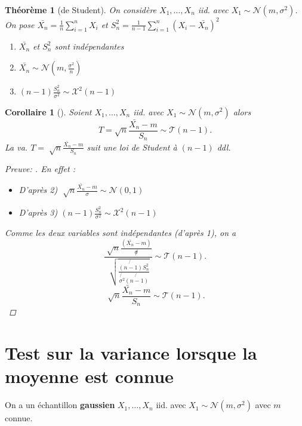\documentclass{article}
\theoremstyle{plain}%
\newtheorem{thm}{Théorème}[section]
\newtheorem*{cor}{Corollaire}
\theoremstyle{definition}
\theoremstyle{remark}
\begin{document}
\begin{thm}[de Student]
    On considère $ X_1, \dots, X_n $ iid. avec $ X_1 \sim \mathcal{N}(m, \sigma ^2) $. \\
    On pose $ \bar{X_n} = \frac{1}{n}\sum_{i=1}^{n}X_i $ et $ S_n^2 = \frac{1}{n-1}\sum_{i=1}^{n}(X_i - \bar{X_n})^2$ 
    \begin{enumerate}
        \item $ \bar{X_n} $ et $ S_n^2 $ sont indépendantes
        \item $ \bar{X_n} \sim \mathcal{N}(m, \frac{\sigma ^2}{n}) $ 
        \item $ (n-1) \frac{S_n^2}{\sigma ^2} \sim \mathcal{X}^2 (n-1) $ 
    \end{enumerate}
\end{thm}

\begin{cor}[]
    Soient $ X_1, \dots, X_n $ iid. avec $ X_1 \sim \mathcal{N}(m, \sigma ^2) $ alors 
    \[
        T = \sqrt{n} \frac{\bar{X_n} - m }{S_n} \sim \mathcal{T}(n-1)
    .\]
    La va. $ T= \sqrt[]{n}\frac{\bar{X_n} - m}{S_n} $ suit une loi de Student à $ (n-1) $ ddl.

    \begin{proof}[Preuve: ]
        En effet : 
        \begin{itemize}
            \item D'après 2) $ \sqrt[]{n}\frac{\bar{X_n}-m}{\sigma } \sim \mathcal{N}(0,1) $ 
            \item D'après 3) $ (n-1) \frac{S_n^2}{\sigma ^2} \sim \mathcal{X^2} (n-1) $ 
        \end{itemize}
        Comme les deux variables sont indépendantes (d'après 1), on a 
        \[
            \frac{ \sqrt[]{n} \frac{(\bar{X_n} - m)}{\not \sigma }}{ \sqrt[]{ \frac{\not{(n-1)} S_n^2}{\not{\sigma ^2} \not{(n-1)}}}} \sim \mathcal{T}(n-1)
        .\]
        \[
            \sqrt[]{n}\frac{\bar{X_n} - m}{S_n} \sim \mathcal{T}(n-1)
        .\]
    \end{proof}
\end{cor}

\section{Test sur la variance lorsque la moyenne est connue}
On a un échantillon \textbf{gaussien} $ X_1, \dots, X_n $ iid. avec $ X_1 \sim \mathcal{N}(m, \sigma ^2) $ avec $ m $ connue.
\end{document}
